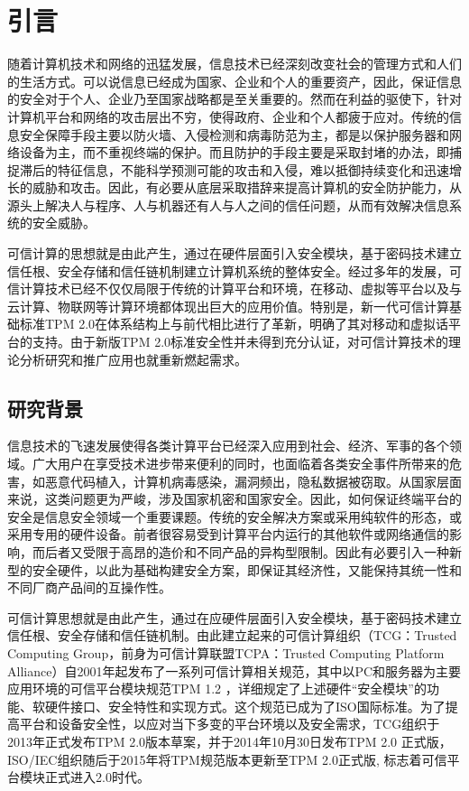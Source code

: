 \chapter{引言}\label{chap:introduction}

随着计算机技术和网络的迅猛发展，信息技术已经深刻改变社会的管理方式和人们的生活方式。可以说信息已经成为国家、企业和个人的重要资产，因此，保证信息的安全对于个人、企业乃至国家战略都是至关重要的。然而在利益的驱使下，针对计算机平台和网络的攻击层出不穷，使得政府、企业和个人都疲于应对。传统的信息安全保障手段主要以防火墙、入侵检测和病毒防范为主，都是以保护服务器和网络设备为主，而不重视终端的保护。而且防护的手段主要是采取封堵的办法，即捕捉滞后的特征信息，不能科学预测可能的攻击和入侵，难以抵御持续变化和迅速增长的威胁和攻击。因此，有必要从底层采取措辞来提高计算机的安全防护能力，从源头上解决人与程序、人与机器还有人与人之间的信任问题，从而有效解决信息系统的安全威胁。

可信计算的思想就是由此产生，通过在硬件层面引入安全模块，基于密码技术建立信任根、安全存储和信任链机制建立计算机系统的整体安全。经过多年的发展，可信计算技术已经不仅仅局限于传统的计算平台和环境，在移动、虚拟等平台以及与云计算、物联网等计算环境都体现出巨大的应用价值。特别是，新一代可信计算基础标准TPM 2.0在体系结构上与前代相比进行了革新，明确了其对移动和虚拟话平台的支持。由于新版TPM 2.0标准安全性并未得到充分认证，对可信计算技术的理论分析研究和推广应用也就重新燃起需求。

\section{研究背景}\label{sec:background}

信息技术的飞速发展使得各类计算平台已经深入应用到社会、经济、军事的各个领域。广大用户在享受技术进步带来便利的同时，也面临着各类安全事件所带来的危害，如恶意代码植入，计算机病毒感染，漏洞频出，隐私数据被窃取。从国家层面来说，这类问题更为严峻，涉及国家机密和国家安全。因此，如何保证终端平台的安全是信息安全领域一个重要课题。传统的安全解决方案或采用纯软件的形态，或采用专用的硬件设备。前者很容易受到计算平台内运行的其他软件或网络通信的影响，而后者又受限于高昂的造价和不同产品的异构型限制。因此有必要引入一种新型的安全硬件，以此为基础构建安全方案，即保证其经济性，又能保持其统一性和不同厂商产品间的互操作性。

可信计算思想就是由此产生，通过在应硬件层面引入安全模块，基于密码技术建立信任根、安全存储和信任链机制。由此建立起来的可信计算组织（TCG：Trusted Computing Group，前身为可信计算联盟TCPA：Trusted Computing Platform Alliance）自2001年起发布了一系列可信计算相关规范，其中以PC和服务器为主要应用环境的可信平台模块规范TPM 1.2 \citep{TPM1}，详细规定了上述硬件“安全模块”的功能、软硬件接口、安全特性和实现方式。这个规范已成为了ISO国际标准\citep{ISO1}。为了提高平台和设备安全性，以应对当下多变的平台环境以及安全需求，TCG组织于2013年正式发布TPM 2.0版本草案，并于2014年10月30日发布TPM 2.0 正式版\citep{TPM2}，ISO/IEC组织随后于2015年将TPM规范版本更新至TPM 2.0正式版\citep{ISO2}, 标志着可信平台模块正式进入2.0时代。

